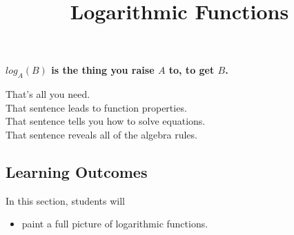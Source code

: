 \documentclass{ximera}
\title{Logarithmic Functions}
\begin{document}
\begin{abstract}
\end{abstract}
\maketitle





\begin{center}
\textbf{\textcolor{red!80!black}{$log_A(B)$ is the thing you raise $A$ to, to get $B$.}}
\end{center}


That's all you need. \\

That sentence leads to function properties. \\

That sentence tells you how to solve equations. \\

That sentence reveals all of the algebra rules. \\










\subsection{Learning Outcomes}


\begin{sectionOutcomes}
In this section, students will 

\begin{itemize}
\item paint a full picture of logarithmic functions.
\end{itemize}
\end{sectionOutcomes}
\end{document}
